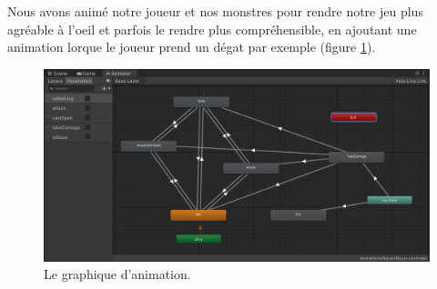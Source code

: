 Nous avons animé notre joueur et nos monstres pour rendre notre jeu plus agréable à l'oeil et parfois le rendre plus compréhensible, en ajoutant une animation lorque le joueur prend un dégat par exemple (figure \ref{fig:animation}).

\FloatBarrier
\begin{figure}[!ht]
    \includegraphics[width=\textwidth]{image/animation.png}
    \caption{Le graphique d'animation.}
    \label{fig:animation}
\end{figure}